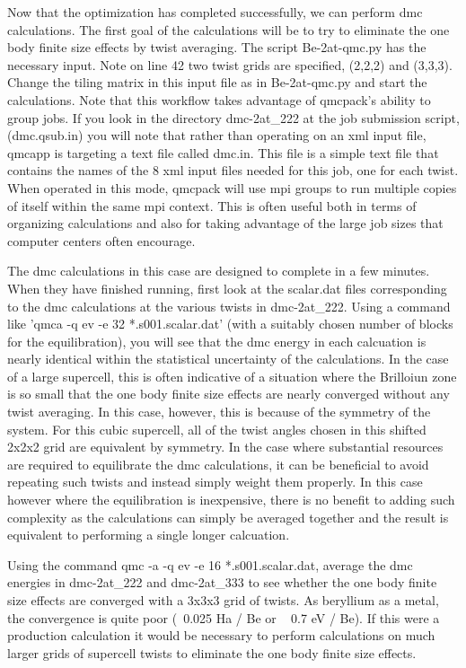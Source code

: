 Now that the optimization has completed successfully, we can perform dmc calculations.  The first goal of the calculations will be to try to eliminate the one body finite size effects by twist averaging.  The script Be-2at-qmc.py has the necessary input.  Note on line 42 two twist grids are specified, (2,2,2) and (3,3,3).  Change the tiling matrix in this input file as in Be-2at-qmc.py and start the calculations.  Note that this workflow takes advantage of qmcpack's ability to group jobs.  If you look in the directory dmc-2at\_222 at the job submission script, (dmc.qsub.in) you will note that rather than operating on an xml input file, qmcapp is targeting a text file called dmc.in.  This file is a simple text file that contains the names of the 8 xml input files needed for this job, one for each twist.  When operated in this mode, qmcpack will use mpi groups to run multiple copies of itself within the same mpi context.  This is often useful both in terms of organizing calculations and also for taking advantage of the large job sizes that computer centers often encourage.

The dmc calculations in this case are designed to complete in a few minutes.  When they have finished running, first look at the scalar.dat files corresponding to the dmc calculations at the various twists in dmc-2at\_222.  Using a command like 'qmca -q ev -e 32 *.s001.scalar.dat' (with a suitably chosen number of blocks for the equilibration), you will see that the dmc energy in each calcuation is nearly identical within the statistical uncertainty of the calculations.  In the case of a large supercell, this is often indicative of a situation where the Brilloiun zone is so small that the one body finite size effects are nearly converged without any twist averaging.  In this case, however, this is because of the symmetry of the system.  For this cubic supercell, all of the twist angles chosen in this shifted 2x2x2 grid are equivalent by symmetry.  In the case where substantial resources are required to equilibrate the dmc calculations, it can be beneficial to avoid repeating such twists and instead simply weight them properly.  In this case however where the equilibration is inexpensive, there is no benefit to adding such complexity as the calculations can simply be averaged together and the result is equivalent to performing a single longer calcuation.

Using the command qmc -a -q ev -e 16 *.s001.scalar.dat, average the dmc energies in dmc-2at\_222 and dmc-2at\_333 to see whether the one body finite size effects are converged with a 3x3x3 grid of twists.  As beryllium as a metal, the convergence is quite poor (~0.025 Ha / Be or ~ 0.7 eV / Be).  If this were a production calculation it would be necessary to perform calculations on much larger grids of supercell twists to eliminate the one body finite size effects.

